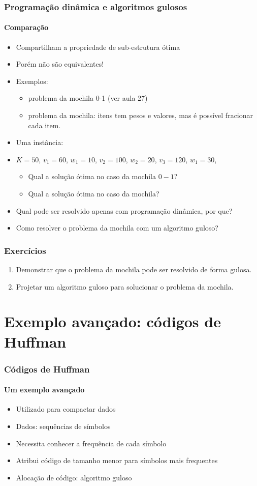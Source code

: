 \documentclass{beamer}
\begin{document}
\begin{frame}
\frametitle{Programação dinâmica e algoritmos gulosos}
\framesubtitle{Comparação}

\begin{itemize}
\item Compartilham a propriedade de sub-estrutura ótima
\item Porém não são equivalentes!
\item Exemplos:
\begin{itemize}
\item problema da mochila 0-1 (ver aula 27)
\item problema da mochila: itens tem pesos e valores, mas é possível fracionar
  cada item.
\end{itemize}
\item Uma instância: \item $K = 50$, $v_1 = 60$, $w_1 = 10$, $v_2 = 100$, $w_2 = 20$, $v_3 = 120$, $w_1 = 30$, 
\begin{itemize}
\item Qual a solução ótima no caso da mochila $0-1$?
\item Qual a solução ótima no caso da mochila?
\end{itemize}
\item Qual pode ser resolvido apenas com programação dinâmica, por que?
\pause
\item Como resolver o problema da mochila com um algoritmo guloso?
\end{itemize}
\end{frame}


\begin{frame}
\frametitle{Exercícios}
\begin{enumerate}
\item Demonstrar que o problema da mochila pode ser resolvido de forma gulosa.
\item Projetar um algoritmo guloso para solucionar o problema da mochila.
\end{enumerate}
\end{frame}

\section{Exemplo avançado: códigos de Huffman}
\begin{frame}
\frametitle{Códigos de Huffman}
\framesubtitle{Um exemplo avançado}

\begin{itemize}
\item Utilizado para compactar dados
\item Dados: sequências de símbolos
\item Necessita conhecer a frequência de cada símbolo
\item Atribui código de tamanho menor para símbolos mais frequentes
\item Alocação de código: algoritmo guloso
\end{itemize}

\end{frame}
\end{document}
